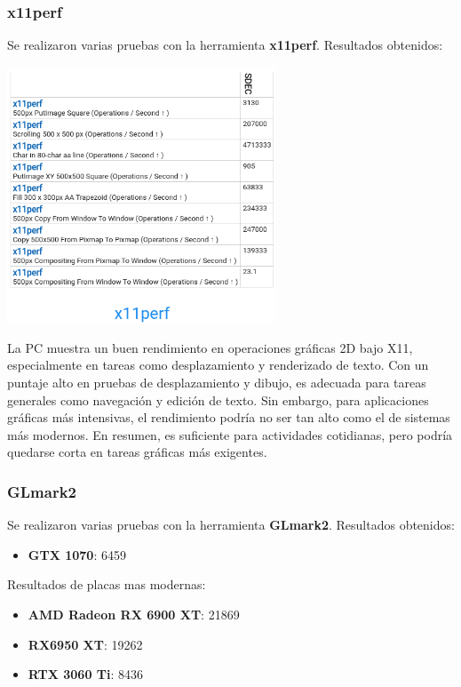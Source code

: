 \subsubsection*{x11perf}
Se realizaron varias pruebas con la herramienta \textbf{x11perf}.  
Resultados obtenidos:

\begin{center}
\includegraphics[width=0.6\textwidth]{img/x11perf.png}
\end{center}
La PC muestra un buen rendimiento en operaciones gráficas 2D bajo X11, especialmente en tareas como desplazamiento y renderizado de texto. Con un puntaje alto en pruebas de desplazamiento y dibujo, es adecuada para tareas generales como navegación y edición de texto. Sin embargo, para aplicaciones gráficas más intensivas, el rendimiento podría no ser tan alto como el de sistemas más modernos. En resumen, es suficiente para actividades cotidianas, pero podría quedarse corta en tareas gráficas más exigentes.
\subsubsection*{GLmark2}
Se realizaron varias pruebas con la herramienta \textbf{GLmark2}.  
Resultados obtenidos:

\begin{itemize}
    \item \textbf{GTX 1070}: 6459
\end{itemize}

Resultados de placas mas modernas:

\begin{center}
    \begin{itemize}
        \item \textbf{AMD Radeon RX 6900 XT}: 21869
        \item \textbf{RX6950 XT}: 19262
        \item \textbf{RTX 3060 Ti}: 8436
    \end{itemize}    
\end{center}

